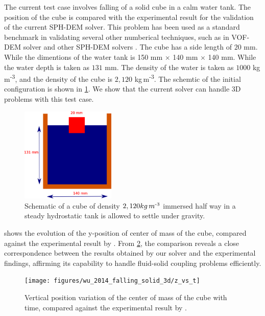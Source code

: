 \documentclass[preprint,12pt]{elsarticle}
\begin{document}
The current test case involves falling of a solid cube in a calm water
tank. The position of the cube is compared with the
experimental\cite{wu2014two} result for the validation of the current SPH-DEM
solver. This problem has been used as a standard benchmark in validating
several other numberical techniques, such as in VOF-DEM solver
\cite{nan2022cfd} and other SPH-DEM solvers \cite{qiu20173d}. The cube has a
side length of $20$ mm. While the dimentions of the water tank is 150 mm
$\times$ 140 mm $\times$ 140 mm. While the water depth is taken as $131$ mm. The density
of the water is taken as $1000$ kg\,m\textsuperscript{-3}, and the density of
the cube is $2,120$ kg\,m\textsuperscript{-3}. The schemtic of the initial
configuration is shown in \cref{fig:results_rfc_02_falling}. We show that the
current solver can handle 3D problems with this test case.
\begin{figure}[!htpb]
  \centering
  \includegraphics[width=0.4\textwidth]{images/rfc_02_falling_solid_in_water/schematic}
  \caption{Schematic of a cube of density $2,120 kg\,m\textsuperscript{-3}$
    immersed half way in a steady hydrostatic tank is allowed to settle under
    gravity.}
  \label{fig:results_rfc_02_falling}
\end{figure}



 shows the evolution of the y-position of
center of mass of the cube, compared against the experimental result by
\citet{wu2014two}. From \cref{fig:results_rfc_02_y_vs_t}, the comparison
reveals a close correspondence between the results obtained by our solver and
the experimental findings, affirming its capability to handle fluid-solid
coupling problems efficiently.
\begin{figure}[!htpb]
  \centering
  \texttt{[image: figures/wu\_2014\_falling\_solid\_3d/z\_vs\_t]}
  \caption{Vertical position variation of the center of mass of the cube with
    time, compared against the experimental result by \citet{wu2014two}.}
  \label{fig:results_rfc_02_y_vs_t}
\end{figure}
\end{document}
